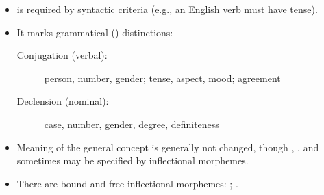 \documentclass[a4paper,landscape,headrule,footrule]{foils}
\begin{document}



  \begin{itemize}
    \item {} is required by syntactic criteria (e.g., an English verb must have tense).
    \item It marks grammatical () distinctions:
      \begin{description}
        \item[Conjugation (verbal):] person, number, gender; tense, aspect, mood; agreement
        \item[Declension (nominal):] case, number, gender, degree, definiteness
      \end{description}
    \item Meaning of the general concept is generally not changed, though , , and sometimes  may be specified by inflectional morphemes.
    \item There are bound and free inflectional morphemes: ; .
  \end{itemize}
\end{document}
